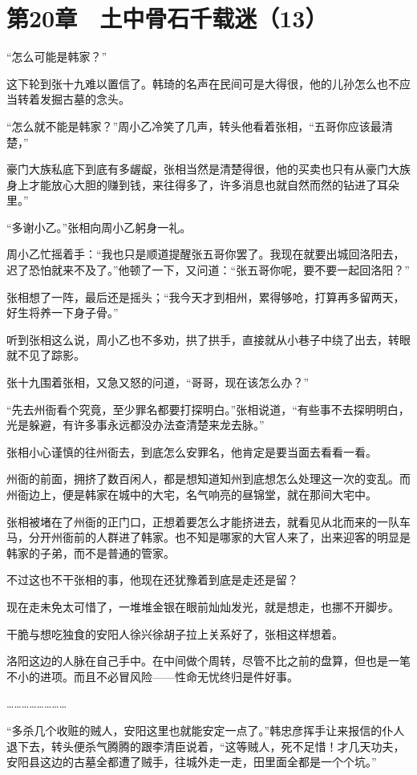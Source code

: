 \section{第20章　土中骨石千载迷（13）}

“怎么可能是韩家？”

这下轮到张十九难以置信了。韩琦的名声在民间可是大得很，他的儿孙怎么也不应当转着发掘古墓的念头。

“怎么就不能是韩家？”周小乙冷笑了几声，转头他看着张相，“五哥你应该最清楚，”

豪门大族私底下到底有多龌龊，张相当然是清楚得很，他的买卖也只有从豪门大族身上才能放心大胆的赚到钱，来往得多了，许多消息也就自然而然的钻进了耳朵里。”

“多谢小乙。”张相向周小乙躬身一礼。

周小乙忙摇着手：“我也只是顺道提醒张五哥你罢了。我现在就要出城回洛阳去，迟了恐怕就来不及了。”他顿了一下，又问道：“张五哥你呢，要不要一起回洛阳？”

张相想了一阵，最后还是摇头；“我今天才到相州，累得够呛，打算再多留两天，好生将养一下身子骨。”

听到张相这么说，周小乙也不多劝，拱了拱手，直接就从小巷子中绕了出去，转眼就不见了踪影。

张十九围着张相，又急又怒的问道，“哥哥，现在该怎么办？”

“先去州衙看个究竟，至少罪名都要打探明白。”张相说道，“有些事不去探明明白，光是躲避，有许多事永远都没办法查清楚来龙去脉。”

张相小心谨慎的往州衙去，到底怎么安罪名，他肯定是要当面去看看一看。

州衙的前面，拥挤了数百闲人，都是想知道知州到底想怎么处理这一次的变乱。而州衙边上，便是韩家在城中的大宅，名气响亮的昼锦堂，就在那间大宅中。

张相被堵在了州衙的正门口，正想着要怎么才能挤进去，就看见从北而来的一队车马，分开州衙前的人群进了韩家。也不知是哪家的大官人来了，出来迎客的明显是韩家的子弟，而不是普通的管家。

不过这也不干张相的事，他现在还犹豫着到底是走还是留？

现在走未免太可惜了，一堆堆金银在眼前灿灿发光，就是想走，也挪不开脚步。

干脆与想吃独食的安阳人徐兴徐胡子拉上关系好了，张相这样想着。

洛阳这边的人脉在自己手中。在中间做个周转，尽管不比之前的盘算，但也是一笔不小的进项。而且不必冒风险——性命无忧终归是件好事。

……………………

“多杀几个收赃的贼人，安阳这里也就能安定一点了。”韩忠彦挥手让来报信的仆人退下去，转头便杀气腾腾的跟李清臣说着，“这等贼人，死不足惜！才几天功夫，安阳县这边的古墓全都遭了贼手，往城外走一走，田里面全都是一个个坑。”

